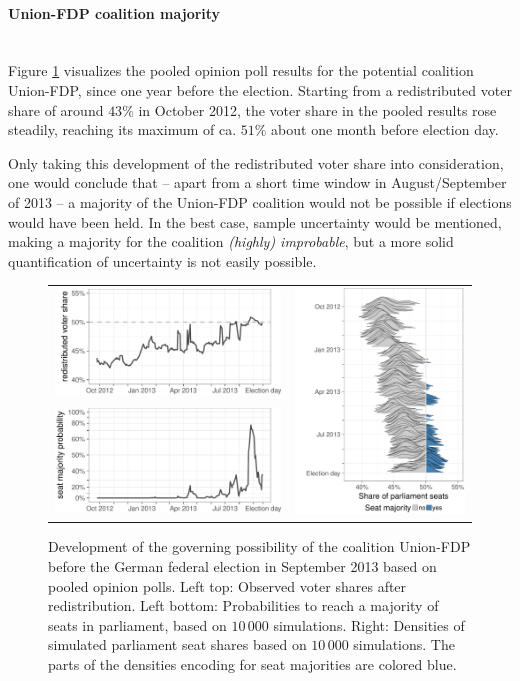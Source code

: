 \documentclass[smallcondensed]{svjour3}     %
\begin{document}
\paragraph{Union-FDP coalition majority} \ \\
Figure \ref{fig:2013_cdufdp} visualizes the pooled opinion poll results
for the potential coalition Union-FDP, since one year before the election.
Starting from a redistributed voter share of around $43\%$ in October 2012,
the voter share in the pooled results rose steadily, reaching its maximum
of ca. $51\%$ about one month before election day.

Only taking this development of the redistributed voter share into
consideration, one would conclude that -- apart from a short
time window in August/September of 2013 -- a majority of the Union-FDP
coalition would not be possible if elections would have been held.
In the best case, sample uncertainty would be mentioned, making
a majority for the coalition {\it (highly) improbable}, but a more
solid quantification of uncertainty is not easily possible.

\begin{figure}[H]\centering
\begin{tabular}{ll}
\includegraphics[height=.15\textwidth]{figures/2013_pooled_cdufdp_rawSharesRedist.pdf}
&
\multirow{2}{*}[13ex]{\includegraphics[height=30ex]{figures/2013_pooled_cdufdp_ridgeline.pdf}}
\\
\includegraphics[height=.15\textwidth]{figures/2013_pooled_cdufdp_prob.pdf}
\end{tabular}
\caption{Development of the governing possibility of the coalition Union-FDP before the German federal election in September 2013 based on pooled opinion polls.
Left top: Observed voter shares after redistribution. Left bottom: Probabilities to reach a majority of seats in parliament, based on $10\,000$ simulations. Right: Densities of simulated parliament seat shares based on $10\,000$ simulations. The parts of the densities encoding for seat majorities are colored blue.
\label{fig:2013_cdufdp}
}
\end{figure}
\end{document}
